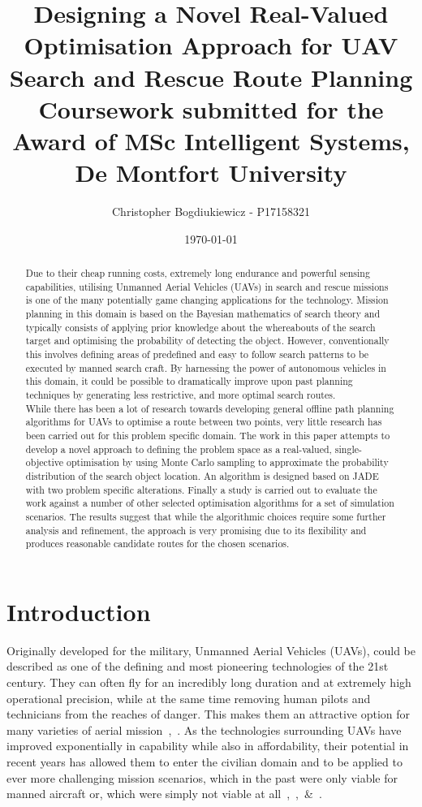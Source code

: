 \documentclass[10pt,a4paper, oneside, conference]{IEEEtran}
\title{Designing a Novel Real-Valued Optimisation Approach for UAV Search and Rescue Route Planning\\ \Large{Coursework submitted for the Award of MSc Intelligent Systems, De Montfort University}}
\date{\today}
\author{Christopher Bogdiukiewicz - P17158321}
\begin{document}
	\maketitle
	
	\begin{abstract}
	Due to their cheap running costs, extremely long endurance and powerful sensing capabilities, utilising Unmanned Aerial Vehicles (UAVs) in search and rescue missions is one of the many potentially game changing applications for the technology.
	Mission planning in this domain is based on the Bayesian mathematics of search theory and typically consists of applying prior knowledge about the whereabouts of the search target and optimising the probability of detecting the object. 
	However, conventionally this involves defining areas of predefined and easy to follow search patterns to be executed by manned search craft. 
	By harnessing the power of autonomous vehicles in this domain, it could be possible to dramatically improve upon past planning techniques by generating less restrictive, and more optimal search routes.\\
	While there has been a lot of research towards developing general offline path planning algorithms for UAVs to optimise a route between two points, very little research has been carried out for this problem specific domain.
	The work in this paper attempts to develop a novel approach to defining the problem space as a real-valued, single-objective optimisation by using Monte Carlo sampling to approximate the probability distribution of the search object location.
	An algorithm is designed based on JADE with two problem specific alterations.
	Finally a study is carried out to evaluate the work against a number of other selected optimisation algorithms for a set of simulation scenarios. The results suggest that while the algorithmic choices require some further analysis and refinement, the approach is very promising due to its flexibility and produces reasonable candidate routes for the chosen scenarios.
	\end{abstract}
	
	\section{Introduction}
	\label{section:intro}
	Originally developed for the military, Unmanned Aerial Vehicles (UAVs), could be described as one of the defining and most pioneering technologies of the 21st century. 
	They can often fly for an incredibly long duration and at extremely high operational precision, while at the same time removing human pilots and technicians from the reaches of danger. This makes them an attractive option for many varieties of aerial mission~\cite{Besada-portas2010},~\cite{Yang2015}.
	As the technologies surrounding UAVs have improved exponentially in capability while also in affordability, their potential in recent years has allowed them to enter the civilian domain and to be applied to ever more challenging mission scenarios, which in the past were only viable for manned aircraft or, which were simply not viable at all~\cite{Sarris2001},~\cite{Cai2014},~\cite{StuartMAdams2011}\&~\cite{Julian_Tan_Kok_Ping-2012}. 
	
\end{document}

